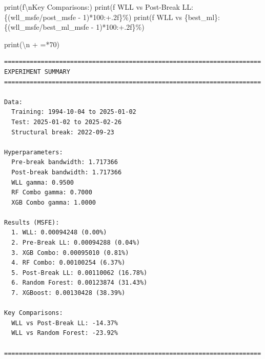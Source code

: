 \documentclass[
  letterpaper,
  DIV=11,
  numbers=noendperiod]{scrartcl}
\newenvironment{Shaded}{\begin{snugshade}}{\end{snugshade}}
\newcommand{\BuiltInTok}[1]{\textcolor[rgb]{0.00,0.23,0.31}{#1}}
\newcommand{\CharTok}[1]{\textcolor[rgb]{0.13,0.47,0.30}{#1}}
\newcommand{\DecValTok}[1]{\textcolor[rgb]{0.68,0.00,0.00}{#1}}
\newcommand{\NormalTok}[1]{\textcolor[rgb]{0.00,0.23,0.31}{#1}}
\newcommand{\OperatorTok}[1]{\textcolor[rgb]{0.37,0.37,0.37}{#1}}
\newcommand{\SpecialCharTok}[1]{\textcolor[rgb]{0.37,0.37,0.37}{#1}}
\newcommand{\SpecialStringTok}[1]{\textcolor[rgb]{0.13,0.47,0.30}{#1}}
\newcommand{\StringTok}[1]{\textcolor[rgb]{0.13,0.47,0.30}{#1}}
\begin{document}
\begin{Shaded}
\begin{Highlighting}[]
\BuiltInTok{print}\NormalTok{(}\SpecialStringTok{f\textquotesingle{}}\CharTok{\textbackslash{}n}\SpecialStringTok{Key Comparisons:\textquotesingle{}}\NormalTok{)}
\BuiltInTok{print}\NormalTok{(}\SpecialStringTok{f\textquotesingle{}  WLL vs Post{-}Break LL: }\SpecialCharTok{\{}\NormalTok{(wll\_msfe}\OperatorTok{/}\NormalTok{post\_msfe }\OperatorTok{{-}} \DecValTok{1}\NormalTok{)}\OperatorTok{*}\DecValTok{100}\SpecialCharTok{:+.2f\}}\SpecialStringTok{\%\textquotesingle{}}\NormalTok{)}
\BuiltInTok{print}\NormalTok{(}\SpecialStringTok{f\textquotesingle{}  WLL vs }\SpecialCharTok{\{}\NormalTok{best\_ml}\SpecialCharTok{\}}\SpecialStringTok{: }\SpecialCharTok{\{}\NormalTok{(wll\_msfe}\OperatorTok{/}\NormalTok{best\_ml\_msfe }\OperatorTok{{-}} \DecValTok{1}\NormalTok{)}\OperatorTok{*}\DecValTok{100}\SpecialCharTok{:+.2f\}}\SpecialStringTok{\%\textquotesingle{}}\NormalTok{)}

\BuiltInTok{print}\NormalTok{(}\StringTok{\textquotesingle{}}\CharTok{\textbackslash{}n}\StringTok{\textquotesingle{}} \OperatorTok{+} \StringTok{\textquotesingle{}=\textquotesingle{}}\OperatorTok{*}\DecValTok{70}\NormalTok{)}
\end{Highlighting}
\end{Shaded}

\begin{verbatim}
======================================================================
EXPERIMENT SUMMARY
======================================================================

Data:
  Training: 1994-10-04 to 2025-01-02
  Test: 2025-01-02 to 2025-02-26
  Structural break: 2022-09-23

Hyperparameters:
  Pre-break bandwidth: 1.717366
  Post-break bandwidth: 1.717366
  WLL gamma: 0.9500
  RF Combo gamma: 0.7000
  XGB Combo gamma: 1.0000

Results (MSFE):
  1. WLL: 0.00094248 (0.00%)
  2. Pre-Break LL: 0.00094288 (0.04%)
  3. XGB Combo: 0.00095010 (0.81%)
  4. RF Combo: 0.00100254 (6.37%)
  5. Post-Break LL: 0.00110062 (16.78%)
  6. Random Forest: 0.00123874 (31.43%)
  7. XGBoost: 0.00130428 (38.39%)

Key Comparisons:
  WLL vs Post-Break LL: -14.37%
  WLL vs Random Forest: -23.92%

======================================================================
\end{verbatim}
\end{document}
